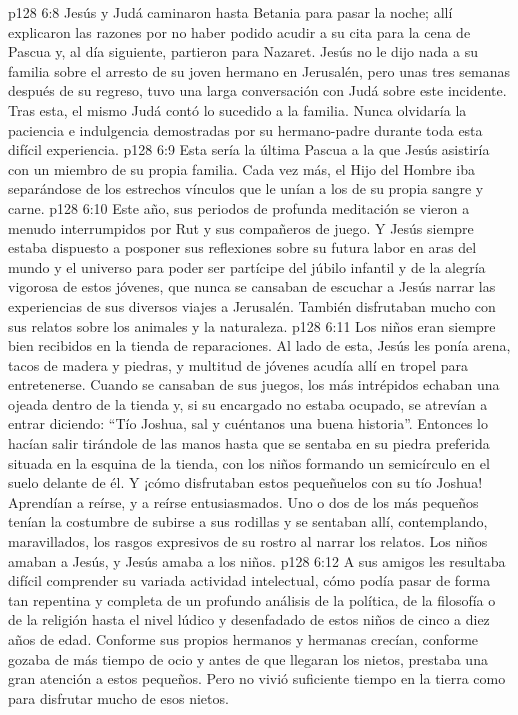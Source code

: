 \vs p128 6:8 Jesús y Judá caminaron hasta Betania para pasar la noche; allí explicaron las razones por no haber podido acudir a su cita para la cena de Pascua y, al día siguiente, partieron para Nazaret. Jesús no le dijo nada a su familia sobre el arresto de su joven hermano en Jerusalén, pero unas tres semanas después de su regreso, tuvo una larga conversación con Judá sobre este incidente. Tras esta, el mismo Judá contó lo sucedido a la familia. Nunca olvidaría la paciencia e indulgencia demostradas por su hermano\hyp{}padre durante toda esta difícil experiencia.
\vs p128 6:9 Esta sería la última Pascua a la que Jesús asistiría con un miembro de su propia familia. Cada vez más, el Hijo del Hombre iba separándose de los estrechos vínculos que le unían a los de su propia sangre y carne.
\vs p128 6:10 \pc Este año, sus periodos de profunda meditación se vieron a menudo interrumpidos por Rut y sus compañeros de juego. Y Jesús siempre estaba dispuesto a posponer sus reflexiones sobre su futura labor en aras del mundo y el universo para poder ser partícipe del júbilo infantil y de la alegría vigorosa de estos jóvenes, que nunca se cansaban de escuchar a Jesús narrar las experiencias de sus diversos viajes a Jerusalén. También disfrutaban mucho con sus relatos sobre los animales y la naturaleza.
\vs p128 6:11 Los niños eran siempre bien recibidos en la tienda de reparaciones. Al lado de esta, Jesús les ponía arena, tacos de madera y piedras, y multitud de jóvenes acudía allí en tropel para entretenerse. Cuando se cansaban de sus juegos, los más intrépidos echaban una ojeada dentro de la tienda y, si su encargado no estaba ocupado, se atrevían a entrar diciendo: “Tío Joshua, sal y cuéntanos una buena historia”. Entonces lo hacían salir tirándole de las manos hasta que se sentaba en su piedra preferida situada en la esquina de la tienda, con los niños formando un semicírculo en el suelo delante de él. Y ¡cómo disfrutaban estos pequeñuelos con su tío Joshua! Aprendían a reírse, y a reírse entusiasmados. Uno o dos de los más pequeños tenían la costumbre de subirse a sus rodillas y se sentaban allí, contemplando, maravillados, los rasgos expresivos de su rostro al narrar los relatos. Los niños amaban a Jesús, y Jesús amaba a los niños.
\vs p128 6:12 A sus amigos les resultaba difícil comprender su variada actividad intelectual, cómo podía pasar de forma tan repentina y completa de un profundo análisis de la política, de la filosofía o de la religión hasta el nivel lúdico y desenfadado de estos niños de cinco a diez años de edad. Conforme sus propios hermanos y hermanas crecían, conforme gozaba de más tiempo de ocio y antes de que llegaran los nietos, prestaba una gran atención a estos pequeños. Pero no vivió suficiente tiempo en la tierra como para disfrutar mucho de esos nietos.
